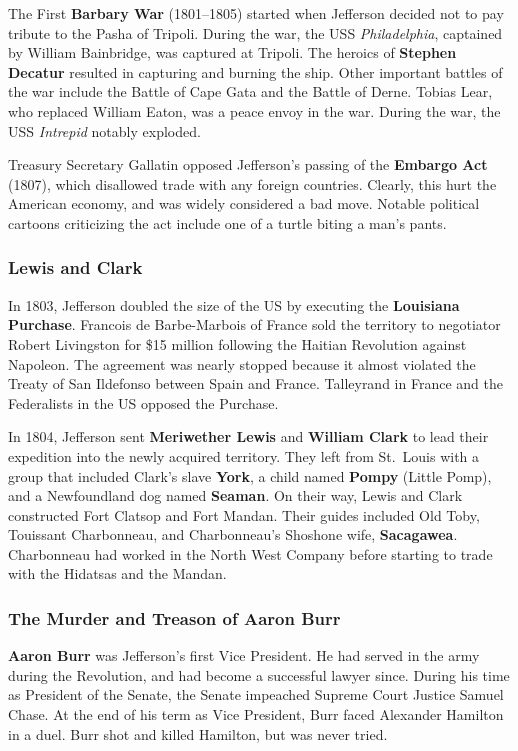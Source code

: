 The First \textbf{Barbary War} (1801--1805)
started when Jefferson decided not to pay tribute to the Pasha of Tripoli.
During the war, the USS \textit{Philadelphia}, captained by William Bainbridge, was captured at Tripoli.
The heroics of \textbf{Stephen Decatur} resulted in capturing and burning the ship.
Other important battles of the war include the Battle of Cape Gata and the Battle of Derne.
Tobias Lear, who replaced William Eaton, was a peace envoy in the war.
During the war, the USS \textit{Intrepid} notably exploded.

Treasury Secretary Gallatin opposed Jefferson's passing of the \textbf{Embargo Act} (1807),
which disallowed trade with any foreign countries.
Clearly, this hurt the American economy, and was widely considered a bad move.
Notable political cartoons criticizing the act include one of a turtle biting a man's pants.

\subsubsection*{Lewis and Clark}

In 1803, Jefferson doubled the size of the US by executing the \textbf{Louisiana Purchase}.
Francois de Barbe-Marbois of France sold the territory to negotiator Robert Livingston for \$15 million
following the Haitian Revolution against Napoleon.
The agreement was nearly stopped because it almost violated the Treaty of San Ildefonso between Spain and France.
Talleyrand in France and the Federalists in the US opposed the Purchase.

In 1804, Jefferson sent \textbf{Meriwether Lewis} and \textbf{William Clark}
to lead their expedition into the newly acquired territory.
They left from St.\ Louis with a group that included
Clark's slave \textbf{York}, a child named \textbf{Pompy} (Little Pomp),
and a Newfoundland dog named \textbf{Seaman}.
On their way, Lewis and Clark constructed Fort Clatsop and Fort Mandan.
Their guides included Old Toby, Touissant Charbonneau, and Charbonneau's Shoshone wife, \textbf{Sacagawea}.
Charbonneau had worked in the North West Company before starting to trade with the Hidatsas and the Mandan.

\subsubsection*{The Murder and Treason of Aaron Burr}

\textbf{Aaron Burr} was Jefferson's first Vice President.
He had served in the army during the Revolution, and had become a successful lawyer since.
During his time as President of the Senate, the Senate impeached Supreme Court Justice Samuel Chase.
At the end of his term as Vice President, Burr faced Alexander Hamilton in a duel.
Burr shot and killed Hamilton, but was never tried.

